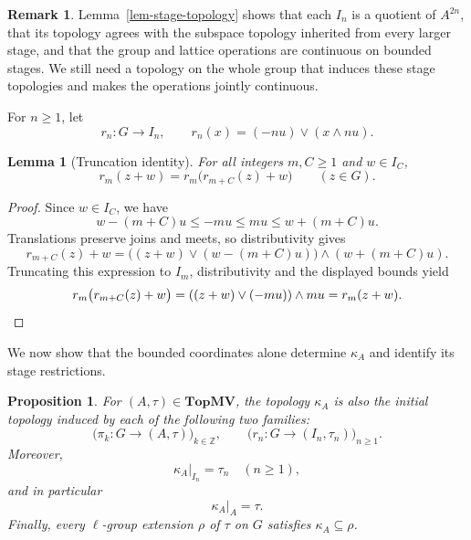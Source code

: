 \documentclass[preprint,3p]{elsarticle}
\theoremstyle{plain}
\newtheorem{lem}[thm]{Lemma}
\newtheorem{prop}[thm]{Proposition}
\theoremstyle{definition}
\newtheorem{rem}[thm]{Remark}
\newcommand{\TopMV}{\mathbf{TopMV}}
\numberwithin{equation}{section}
\begin{document}
\begin{rem}
Lemma~\ref{lem-stage-topology} shows that each $I_n$ is a quotient
of $A^{2n}$, that its topology agrees with the subspace topology
inherited from every larger stage, and that the group and lattice
operations are continuous on bounded stages. We still need a topology
on the whole group that induces these stage topologies and makes
the operations jointly continuous.
\end{rem}

For $n\geq1$, let
\begin{equation}
\label{eq-truncation-map}
 r_n\colon G\longrightarrow I_n,
 \qquad r_n(x)=(-nu)\vee(x\wedge nu).
\end{equation}

\begin{lem}[Truncation identity]
\label{lem-truncation-identity}
For all integers $m,C\geq1$ and $w\in I_C$,
\[
 r_m(z+w)=r_m\bigl(r_{m+C}(z)+w\bigr)
 \qquad(z\in G).
\]
\end{lem}

\begin{proof}
Since $w\in I_C$, we have
\[
 w-(m+C)u\leq -mu\leq mu\leq w+(m+C)u.
\]
Translations preserve joins and meets, so distributivity gives
\[
 r_{m+C}(z)+w
 =\bigl((z+w)\vee(w-(m+C)u)\bigr)\wedge(w+(m+C)u).
\]
Truncating this expression to $I_m$, distributivity and the displayed
bounds yield
\[
 r_m\bigl(r_{m+C}(z)+w\bigr)
 =((z+w)\vee(-mu))\wedge mu
 =r_m(z+w).\qedhere
\]
\end{proof}

We now show that the bounded coordinates alone determine $\kappa_A$
and identify its stage restrictions.

\begin{prop}
\label{prop-kappa-lambda}
For $(A,\tau)\in\TopMV$, the topology $\kappa_A$ is also
the initial topology induced by each of the following two families:
\begin{equation}
\label{eq-coordinate-initial-family}
 \bigl(\pi_k\colon G\longrightarrow(A,\tau)\bigr)_{k\in\mathbb Z},
 \qquad
 \bigl(r_n\colon G\longrightarrow(I_n,\tau_n)\bigr)_{n\geq1}.
\end{equation}
Moreover,
\begin{equation}
\label{eq-kappa-stage-restriction}
 \kappa_A|_{I_n}=\tau_n\quad(n\geq1),
\end{equation}
and in particular
\begin{equation}
\label{eq-coordinate-interval-exactness}
 \kappa_A|_A=\tau.
\end{equation}
Finally, every $\ell$-group extension $\rho$ of $\tau$ on $G$
satisfies $\kappa_A\subseteq\rho$.
\end{prop}
\end{document}
